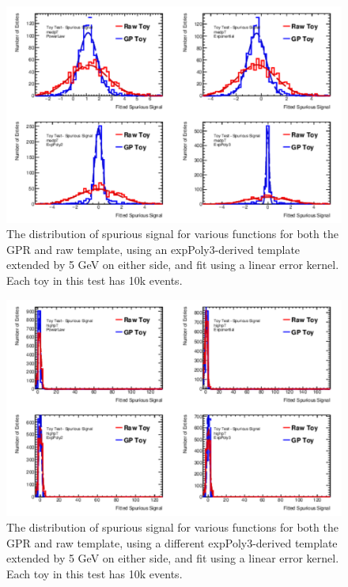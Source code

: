 \begin{figure} 
\begin{center}
  \includegraphics[width=\textwidth]{figures/background/gpr/validation/linear/ToyTest_FitSigVals_medpT_10k_noSig}   
\caption{The distribution of spurious signal for various functions for both the GPR and raw template, using an expPoly3-derived template extended by 5 GeV on either side, and fit using a linear error kernel. Each toy in this test has 10k events.}
\label{fig:linearkernel_medpt_10k_noSig}
\end{center}
\end{figure}

\begin{figure} 
\begin{center}
  \includegraphics[width=\textwidth]{figures/background/gpr/validation/linear/ToyTest_FitSigVals_highpT_10k_noSig}   
\caption{The distribution of spurious signal for various functions for both the GPR and raw template, using a different expPoly3-derived template extended by 5 GeV on either side, and fit using a linear error kernel. Each toy in this test has 10k events.}
\label{fig:linearkernel_highpt_10k_noSig}
\end{center}
\end{figure}

